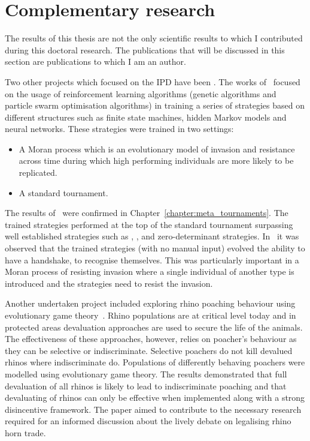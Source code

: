 \section{Complementary research}

The results of this thesis are not the only scientific results to which I
contributed during this doctoral research. The publications that will be
discussed in this section are publications to which I am an author.

Two other projects which focused on the IPD have been
\cite{Knight2017, KnightHGC17}. The works of~\cite{Knight2017, KnightHGC17}
focused on the usage of reinforcement learning algorithms (genetic algorithms
and particle swarm optimisation algorithms) in training a series of strategies
based on different structures such as finite state machines, hidden Markov
models and neural networks. These strategies were trained in two settings:

\begin{itemize}
    \item A Moran process which is an evolutionary model of invasion and
    resistance across time during which high performing individuals are more
    likely to be replicated.
    \item A standard tournament.
\end{itemize}

The results of~\cite{Knight2017} were confirmed in
Chapter~\ref{chapter:meta_tournaments}. The trained strategies performed at
the top of the standard tournament surpassing well established
strategies such as \TitForTat, \Pavlov, \Gradual and zero-determinant strategies.
In~\cite{KnightHGC17} it was observed that the trained strategies (with no manual
input) evolved the ability to have a handshake, to recognise themselves. This
was particularly important in a Moran process of resisting invasion where a
single individual of another type is introduced and the strategies need to
resist the invasion.

Another undertaken project included exploring rhino poaching behaviour using
evolutionary game theory~\cite{Glynatsi2018}. Rhino populations are at critical
level today and in protected areas devaluation approaches are used to secure the
life of the animals. The effectiveness of these approaches, however, relies on
poacher's behaviour as they can be selective or indiscriminate. Selective poachers
do not kill devalued rhinos where indiscriminate do. Populations of differently behaving poachers were modelled using
evolutionary game theory. The results
demonstrated that full devaluation of all rhinos is likely to lead to
indiscriminate poaching and that devaluating of rhinos can only be effective
when implemented along with a strong disincentive framework. The paper aimed to
contribute to the necessary research required for an informed discussion about
the lively debate on legalising rhino horn trade.

